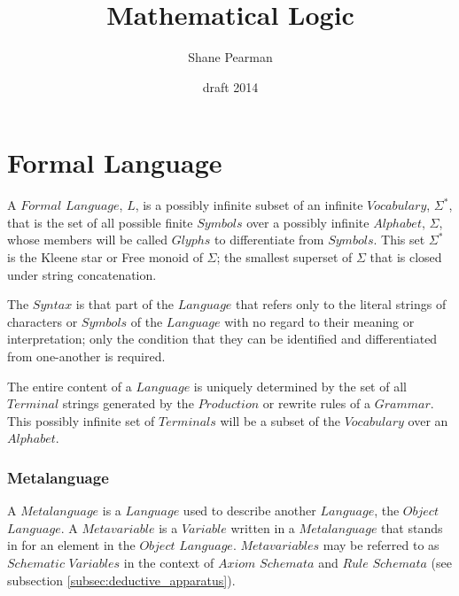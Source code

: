 \documentclass{article}
\begin{document}
\setcounter{secnumdepth}{5}
\setcounter{tocdepth}{5}


\title{Mathematical Logic}
\date{draft 2014}
\author{Shane Pearman}
\maketitle


\tableofcontents

\part{Formal Language}

A $Formal$ $Language$, $L$, is a possibly infinite subset of an
infinite $Vocabulary$, $\Sigma^*$, that is the set of all possible
finite $Symbols$ over a possibly infinite $Alphabet$, $\Sigma$, whose
members will be called $Glyphs$ to differentiate from $Symbols$. This
set $\Sigma^*$ is the Kleene star or Free monoid of $\Sigma$; the
smallest superset of $\Sigma$ that is closed under string
concatenation.

The $Syntax$ is that part of the $Language$ that refers only to the
literal strings of characters or $Symbols$ of the $Language$ with no
regard to their meaning or interpretation; only the condition that
they can be identified and differentiated from one-another is
required.

The entire content of a $Language$ is uniquely determined by the set
of all $Terminal$ strings generated by the $Production$ or rewrite
rules of a $Grammar$. This possibly infinite set of $Terminals$ will
be a subset of the $Vocabulary$ over an $Alphabet$.


\section{Metalanguage}

A $Metalanguage$ is a $Language$ used to describe another $Language$,
the $Object$ $Language$. A $Metavariable$ is a $Variable$ written in a
$Metalanguage$ that stands in for an element in the $Object$
$Language$. $Metavariables$ may be referred to as $Schematic$
$Variables$ in the context of $Axiom$ $Schemata$ and $Rule$ $Schemata$
(see subsection \ref{subsec:deductive_apparatus}).
\end{document}

